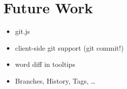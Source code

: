 \section{Future Work}
\label{sec:Related_Work}

\begin{itemize}
	\item git.js
	\item client-side git support (git commit!)
	\item word diff in tooltips
	\item Branches, History, Tags, \dots
\end{itemize}